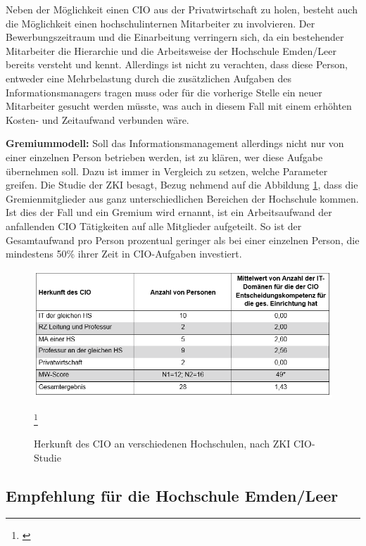 Neben der Möglichkeit einen CIO aus der Privatwirtschaft zu holen, besteht auch die Möglichkeit einen hochschulinternen Mitarbeiter zu involvieren. Der Bewerbungszeitraum und die Einarbeitung verringern sich, da ein bestehender Mitarbeiter die Hierarchie und die Arbeitsweise der Hochschule Emden/Leer bereits versteht und kennt. Allerdings ist nicht zu verachten, dass diese Person, entweder eine Mehrbelastung durch die zusätzlichen Aufgaben des Informationsmanagers tragen muss oder für die vorherige Stelle ein neuer Mitarbeiter gesucht werden müsste, was auch in diesem Fall mit einem erhöhten Kosten- und Zeitaufwand verbunden wäre.


\textbf{Gremiummodell:\newline }
Soll das Informationsmanagement allerdings nicht nur von einer einzelnen Person betrieben werden, ist zu klären, wer diese Aufgabe übernehmen soll. Dazu ist immer in Vergleich zu setzen, welche Parameter greifen. Die Studie der ZKI besagt, Bezug nehmend auf die Abbildung \ref{fig_herkunft_cio_hochschulen}, dass die Gremienmitglieder aus ganz unterschiedlichen Bereichen der Hochschule kommen. Ist dies der Fall und ein Gremium wird ernannt, ist ein Arbeitsaufwand der anfallenden CIO Tätigkeiten auf alle Mitglieder aufgeteilt. So ist der Gesamtaufwand pro Person prozentual geringer als bei einer einzelnen Person, die mindestens 50\% ihrer Zeit in CIO-Aufgaben investiert. 



\begin{figure}[h!]
	\centering
	\includegraphics[width=\textwidth]
	{kapitel/gruppe3/bilder/herkunft_cio_hochschulen}
	\caption{Herkunft des CIO an verschiedenen Hochschulen, nach ZKI CIO-Studie}
	\label{fig_herkunft_cio_hochschulen}\footnote{\cite[8]{zki_studie_cio_2014}}
\end{figure}



\subsection{Empfehlung für die Hochschule Emden/Leer}
\label{empfehlung_cio}

